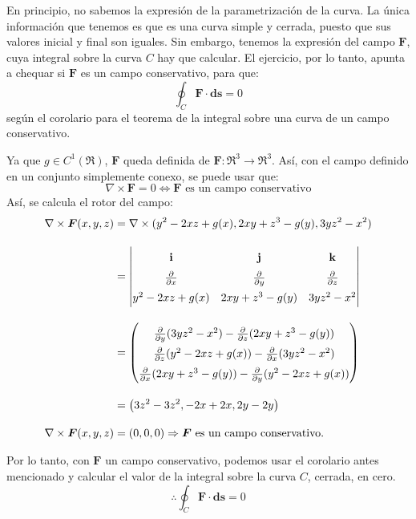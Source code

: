 \begin{solution}
    En principio, no sabemos la expresión de la parametrización de la curva. La única información que tenemos es que es una curva simple y cerrada, puesto que sus valores inicial y final son iguales.
    Sin embargo, tenemos la expresión del campo $\boldsymbol{F}$, cuya integral sobre la curva $C$ hay que calcular. El ejercicio, por lo tanto, apunta a chequar si $\boldsymbol{F}$ es un campo conservativo, para que:
    \begin{equation*}
        \oint_{C}\boldsymbol{F}\cdot\boldsymbol{ds}=0
    \end{equation*}
    según el corolario para el teorema de la integral sobre una curva de un campo conservativo.

    Ya que $g \in C^1(\Re)$, $\boldsymbol{F}$ queda definida de $\boldsymbol{F}:\Re^3\rightarrow\Re^3$. Así, con el campo definido en un conjunto simplemente conexo, se puede usar que:
    \begin{equation*}
        \nabla \times \boldsymbol{F} = 0 \Leftrightarrow \boldsymbol{F} \text{ es un campo conservativo}
    \end{equation*}
    Así, se calcula el rotor del campo:
    \begin{align*}
        \nabla \times \boldsymbol{F}(x,y,z) &= \nabla \times (y^2-2xz+g(x),2xy+z^3-g(y),3yz^2-x^2)\\[10pt]
        &=  \renewcommand{\arraystretch}{1.5} \begin{vmatrix}
                \mathbf{i} & \mathbf{j} & \mathbf{k} \\
                \partialx & \partialy & \partialz \\
                y^2-2xz+g(x) & 2xy+z^3-g(y) & 3yz^2-x^2
            \end{vmatrix} \\[10pt]
    &= \renewcommand{\arraystretch}{1.5} \begin{pmatrix}
        \partialy(3yz^2-x^2) - \partialz(2xy+z^3-g(y)) \\
        \partialz(y^2-2xz+g(x)) - \partialx(3yz^2-x^2) \\
        \partialx(2xy+z^3-g(y)) - \partialy(y^2-2xz+g(x))
        \end{pmatrix}\\[10pt]
    &= \left(3z^2-3z^2,-2x+2x,2y-2y\right)\\[10pt]
    \nabla \times \boldsymbol{F}(x,y,z) &= (0,0,0) \Rightarrow \boldsymbol{F} \text{ es un campo conservativo.}
    \end{align*}

    Por lo tanto, con $\boldsymbol{F}$ un campo conservativo, podemos usar el corolario antes mencionado y calcular el valor de la integral sobre la curva $C$, cerrada, en cero.
    \begin{equation*}
       \therefore \oint_{C}\boldsymbol{F}\cdot\boldsymbol{ds}=0
    \end{equation*}
\end{solution}

